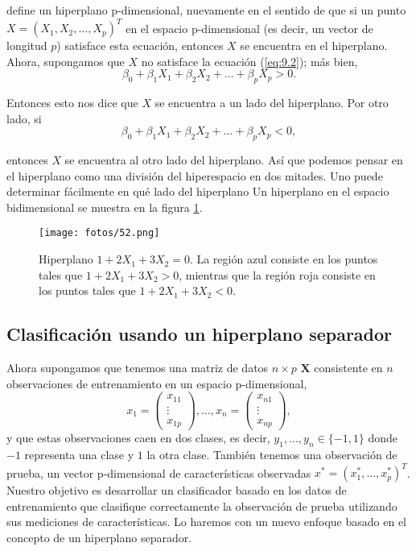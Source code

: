 define un hiperplano p-dimensional, nuevamente en el sentido de que si un punto $X = (X_1, X_2, \ldots, X_p)^T$ en el espacio p-dimensional (es decir, un vector de longitud $p$) satisface esta ecuación, entonces $X$ se encuentra en el hiperplano. \\

\noindent Ahora, supongamos que $X$ no satisface la ecuación (\ref{eq:9.2}); más bien,
\begin{equation}
\beta_0 + \beta_1 X_1 + \beta_2 X_2 + \ldots + \beta_p X_p > 0.
\end{equation}

\noindent Entonces esto nos dice que $X$ se encuentra a un lado del hiperplano. Por otro lado, si
\begin{equation}
\beta_0 + \beta_1 X_1 + \beta_2 X_2 + \ldots + \beta_p X_p < 0,
\end{equation}

entonces $X$ se encuentra al otro lado del hiperplano. Así que podemos pensar en el hiperplano como una división del hiperespacio en dos mitades. Uno puede determinar fácilmente en qué lado del hiperplano Un hiperplano en el espacio bidimensional se muestra en la figura \ref{fig:9.1}.

\begin{figure}[h]
\centering
\texttt{[image: fotos/52.png]}
\caption{Hiperplano $1 + 2X_1 + 3X_2 = 0$. La región azul consiste en los puntos tales que $1 + 2X_1 + 3X_2 > 0$, mientras que la región roja consiste en los puntos tales que $1 + 2X_1 + 3X_2 < 0$.}
\label{fig:9.1}
\end{figure}

\subsection{Clasificación usando un hiperplano separador}

Ahora supongamos que tenemos una matriz de datos $n \times p$ $\mathbf{X}$ consistente en $n$ observaciones de entrenamiento en un espacio p-dimensional,
\begin{equation}
x_1 =
\begin{pmatrix}
x_{11} \\
\vdots \\
x_{1p}
\end{pmatrix}, \ldots, x_n =
\begin{pmatrix}
x_{n1} \\
\vdots \\
x_{np}
\end{pmatrix},
\end{equation}
y que estas observaciones caen en dos clases, es decir, $y_1, \ldots, y_n \in \{-1, 1\}$ donde $-1$ representa una clase y $1$ la otra clase. También tenemos una observación de prueba, un vector p-dimensional de características observadas $x^* = (x^*_1, \ldots, x^*_p)^T$. Nuestro objetivo es desarrollar un clasificador basado en los datos de entrenamiento que clasifique correctamente la observación de prueba utilizando sus mediciones de características. Lo haremos con un nuevo enfoque basado en el concepto de un hiperplano separador. \\

